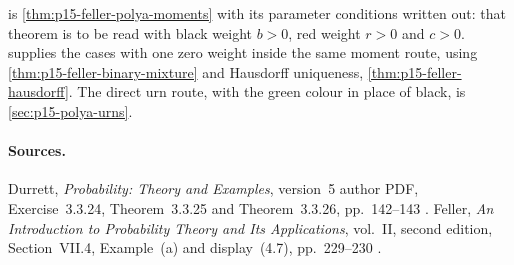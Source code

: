  is
\cref{thm:p15-feller-polya-moments} with its parameter conditions written
out: that theorem is to be read with black weight \(b>0\), red weight
\(r>0\) and \(c>0\).  supplies
the cases with one zero weight inside the same moment route, using
\cref{thm:p15-feller-binary-mixture} and Hausdorff uniqueness,
\cref{thm:p15-feller-hausdorff}. The direct urn route, with the green
colour in place of black, is \cref{sec:p15-polya-urns}.

\paragraph{Sources.}
Durrett, \emph{Probability: Theory and Examples}, version~5 author PDF,
Exercise~3.3.24, Theorem~3.3.25 and Theorem~3.3.26, pp.~142--143
\cite[pp.~142--143]{DurrettPTEAuthor2019}.
Feller, \emph{An Introduction to Probability Theory and Its Applications},
vol.~II, second edition, Section~VII.4, Example~(a) and display~(4.7),
pp.~229--230 \cite[vol.~II, VII.4, pp.~229--230]{Feller1971ProbabilityII}.
